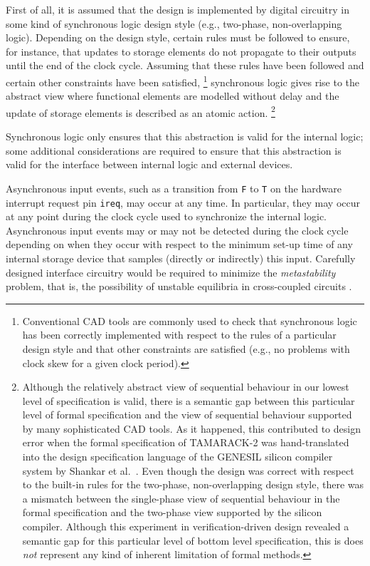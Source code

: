 First of all,
it is assumed that the design is implemented
by digital circuitry in some kind of synchronous logic design style
(e.g., two-phase, non-overlapping logic).
Depending on the design style,
certain rules must be followed to ensure, for instance,
that updates to storage elements do not propagate to their outputs
until the end of the clock cycle.
Assuming that these rules have been followed and certain other constraints
have been satisfied,
\footnote{
Conventional CAD tools are commonly used to
check that synchronous logic has been correctly implemented
with respect to the rules of
a particular design style
and that other constraints are satisfied
(e.g., no problems with clock skew for a given clock period).}
synchronous logic gives rise to the
abstract view where functional elements are modelled without delay
and the update of storage elements is described as an atomic action.
\footnote{
Although the relatively abstract view of sequential behaviour
in our lowest level of specification is valid,
there is a semantic gap between
this particular level of formal specification and
the view of sequential behaviour supported by
many sophisticated CAD tools.
As it happened, this contributed to
design error
when the formal specification of
\mbox{\scriptsize TAMARACK-2}
was hand-translated
into the design specification language
of the {\scriptsize GENESIL} silicon compiler system
by Shankar et al.\ \cite{SRI}.
Even though the design was correct with respect to the
built-in rules for the two-phase, non-overlapping design style,
there was a mismatch between
the single-phase view of sequential behaviour in the
formal specification and
the two-phase view supported by the silicon compiler.
Although this experiment in verification-driven design
revealed a semantic gap for this particular level
of bottom level specification, this is does {\it not}
represent any kind of inherent limitation of formal methods.}

Synchronous logic only ensures that this abstraction is valid
for the internal logic;
some additional considerations are required to ensure that
this abstraction is valid for
the interface between internal logic and external devices.

Asynchronous input events, such as
a transition from \verb"F" to \verb"T" on the hardware interrupt
request pin \verb"ireq", may occur at any time.
In particular, they may occur at any point during the clock cycle
used to synchronize the internal logic.
Asynchronous input events may or may not be detected during
the clock cycle depending on when they occur with respect to
the minimum set-up time of any internal storage device that samples
(directly or indirectly) this input.
Carefully designed interface circuitry
would be required to
minimize the {\it metastability} problem, that is, the possibility
of unstable equilibria in cross-coupled circuits \cite{Seitz}.

